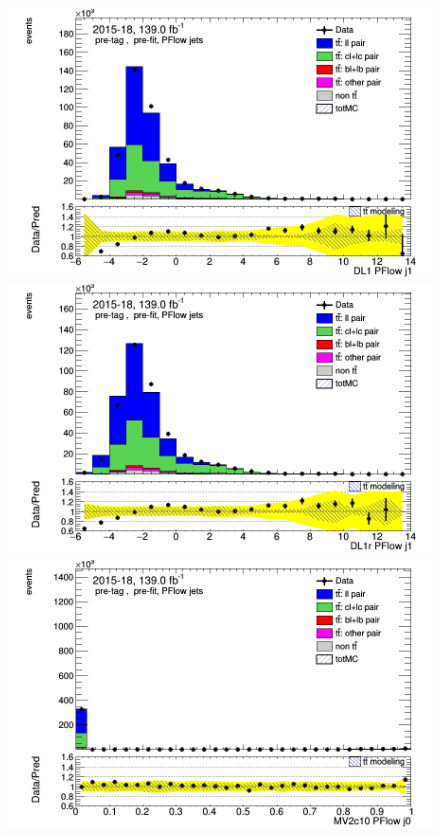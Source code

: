 \documentclass[letterpaper,12pt]{article}
\begin{document}
\begin{figure}[H]
\begin{minipage}[b]{.45\textwidth}
\end{minipage}\hfill
\begin{minipage}[b]{.45\textwidth}
\centering
\includegraphics[width=1\textwidth]{Oct_distributions/pretagNoRwDL1rwithhighpTPFlow_scaledall/DataMC__J1_DL1.png}
\end{minipage}\hfill
\begin{minipage}[b]{.45\textwidth}
\centering
\includegraphics[width=1\textwidth]{Oct_distributions/pretagNoRwDL1rwithhighpTPFlow_scaledall/DataMC__J1_DL1r.png}
\end{minipage}\hfill
\begin{minipage}[b]{.45\textwidth}
\centering
\includegraphics[width=1\textwidth]{Oct_distributions/pretagNoRwDL1rwithhighpTPFlow_scaledall/DataMC_J0_MV2c10.png}

\end{minipage}
\end{figure}
\end{document}
